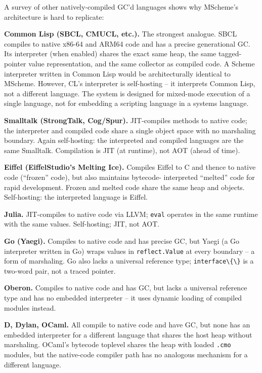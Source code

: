 \documentclass[
  12pt,
]{report}
\newcommand{\passthrough}[1]{#1}
\newcounter{none} %
\begin{document}
A survey of other natively-compiled GC'd languages shows why MScheme's
architecture is hard to replicate:

\textbf{Common Lisp (SBCL, CMUCL, etc.).} The strongest analogue. SBCL
compiles to native x86-64 and ARM64 code and has a precise generational
GC. Its interpreter (when enabled) shares the exact same heap, the same
tagged-pointer value representation, and the same collector as compiled
code. A Scheme interpreter written in Common Lisp would be
architecturally identical to MScheme. However, CL's interpreter is
self-hosting -- it interprets Common Lisp, not a different language. The
system is designed for mixed-mode execution of a single language, not
for embedding a scripting language in a systems language.

\textbf{Smalltalk (StrongTalk, Cog/Spur).} JIT-compiles methods to
native code; the interpreter and compiled code share a single object
space with no marshaling boundary. Again self-hosting: the interpreted
and compiled languages are the same Smalltalk. Compilation is JIT (at
runtime), not AOT (ahead of time).

\textbf{Eiffel (EiffelStudio's Melting Ice).} Compiles Eiffel to C and
thence to native code (``frozen'' code), but also maintains bytecode-
interpreted ``melted'' code for rapid development. Frozen and melted
code share the same heap and objects. Self-hosting: the interpreted
language is Eiffel.

\textbf{Julia.} JIT-compiles to native code via LLVM;
\passthrough{\lstinline!eval!} operates in the same runtime with the
same values. Self-hosting; JIT, not AOT.

\textbf{Go (Yaegi).} Compiles to native code and has precise GC, but
Yaegi (a Go interpreter written in Go) wraps values in
\passthrough{\lstinline!reflect.Value!} at every boundary -- a form of
marshaling. Go also lacks a universal reference type;
\passthrough{\lstinline!interface\{\}!} is a two-word pair, not a traced
pointer.

\textbf{Oberon.} Compiles to native code and has GC, but lacks a
universal reference type and has no embedded interpreter -- it uses
dynamic loading of compiled modules instead.

\textbf{D, Dylan, OCaml.} All compile to native code and have GC, but
none has an embedded interpreter for a different language that shares
the host heap without marshaling. OCaml's bytecode toplevel shares the
heap with loaded \passthrough{\lstinline!.cmo!} modules, but the
native-code compiler path has no analogous mechanism for a different
language.
\end{document}

